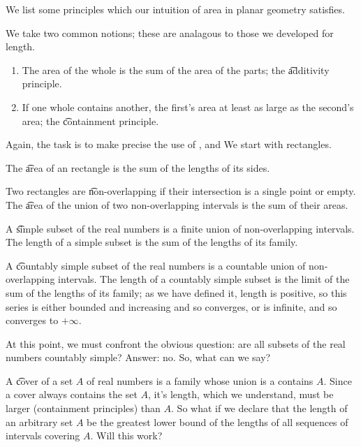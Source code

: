 

We list some principles which our intuition of area in planar geometry satisfies.


We take two common notions; these are analagous to those we developed for length.

\begin{enumerate}

  \item
  The area of the whole is the sum of the area of the parts; the \t{additivity principle}.

  \item
  If one whole contains another, the first's area at least as large as the second's area; the \t{containment principle}.

\end{enumerate}

Again, the task is to make precise the use of ,  and  We start with rectangles.


The \t{area} of an rectangle is the sum of the lengths of its sides.

Two rectangles are \t{non-overlapping} if their intersection is a single point or empty.
The \t{area} of the union of two non-overlapping intervals is the sum of their areas.

A \t{simple} subset of the real numbers is a finite union of non-overlapping intervals.
The length of a simple subset is the sum of the lengths of its family.

A \t{countably simple} subset of the real numbers is a countable union of non-overlapping intervals.
The length of a countably simple subset is the limit of the sum of the lengths
of its family; as we have defined it, length is positive, so this series is either bounded and increasing and so converges, or is infinite, and so converges to $+\infty$.

At this point, we must confront the obvious question: are all subsets of the real numbers
countably simple?
Answer: no.
So, what can we say?

A \t{cover} of a set $A$ of real numbers is a family whose union is a contains $A$.  Since a cover always contains the set $A$, it's length, which we understand, must be larger (containment principles) than $A$.
So what if we declare that the length of an arbitrary set $A$ be the greatest lower bound of the lengths of all sequences of intervals covering $A$.  Will this work?

